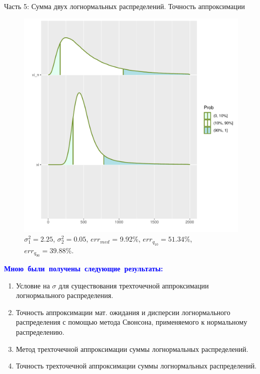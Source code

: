 \documentclass[ucs, notheorems, handout]{beamer}
\begin{document}
\begin{frame}{Часть 5: Сумма двух логнормальных распределений. Точность аппроксимации }
		
	\begin{figure}[h]
		\begin{center}
			\begin{minipage}[h]{0.53\linewidth}
				\includegraphics[width=1\linewidth]{img/par_1.pdf}
				\caption{$\sigma_{1}^{2} = 2.25$, $\sigma_{2}^{2} = 0.05$, $err_{med}$ = 9.92\%,  $err_{q_{10}} = 51.34\%$,  $err_{q_{90}} = 39.88\%$. } %
				\label{ris7} %
			\end{minipage}
			
		\end{center}
	\end{figure}
\end{frame}
	
\begin{frame}{}
	
	
	\textcolor{blue}{\hbox{\textbf{Мною были получены следующие результаты:}}}
	\begin{enumerate}
		\item Условие на $\sigma$ для существования трехточечной аппроксимации логнормального распределения.
		\item Точность аппроксимации мат. ожидания и дисперсии логнормального распределения с помощью метода Свонсона, применяемого к нормальному распределению.
		\item Метод трехточечной аппроксимации суммы логнормальных распределений.
		\item Точность трехточечной аппроксимации суммы логнормальных распределений.
	\end{enumerate}
	
\end{frame}


	
	
\end{document}
